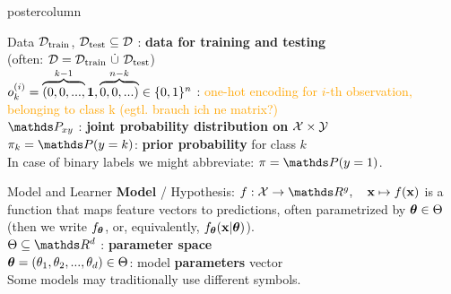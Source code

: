 \documentclass{beamer}
\begin{document}
\begin{frame}[fragile]{}
\begin{columns}
\begin{column}{.31\textwidth}
\begin{beamercolorbox}[center]{postercolumn}
\begin{minipage}{.98\textwidth}
{\begin{myblock}{Data}
$\mathcal{D}_{\text{train}}$, $\mathcal{D}_{\text{test}} \subseteq \mathcal{D}$ : \textbf{data for training and testing} \\ 
(often: $\mathcal{D} = \mathcal{D}_{\text{train}} ~ \dot{\cup} ~ \mathcal{D}_{\text{test}}$)\\
 
$o_k^{(i)} = \overbrace{(0, 0, ...,}^{k - 1} \textbf{1},  \overbrace{0, 0, ...)}^{n - k}
\in \{0, 1\}^n$ : \textcolor{orange}{one-hot encoding for $i$-th observation, belonging to class k  (egtl. brauch ich ne matrix?)} \\
 
$\P_{xy}$ : \textbf{joint probability distribution on} $\mathcal{X} \times \mathcal{Y}$ \\

$\pi_k = \P(y = k)$:\textbf{ prior probability} for class $k$ \\
In case of binary labels we might abbreviate: $\pi = \P(y = 1)$.
  
\end{myblock}
\begin{myblock}{Model and Learner}
\textbf{Model} / Hypothesis: $f : \Xspace \rightarrow \R^g, \quad \xv \mapsto \fx$ is a function that maps feature vectors to predictions, often parametrized by $\bm{\theta} \in \Theta$ \\ (then we write $f_{\bm{\theta}}$, or, equivalently, $f_{\bm{\theta}}(\mathbf{x} | \bm{\theta})$). \\


$\Theta \subseteq \R^d$ : \textbf{parameter space} \\
  
$\bm{\theta} = (\theta_1, \theta_2, ..., \theta_d) \in \Theta$: model \textbf{parameters} vector\\
Some models may traditionally use different symbols. \\
				

\end{myblock}}
\end{minipage}
\end{beamercolorbox}
\end{column}
\end{columns}
\end{frame}
\end{document}
